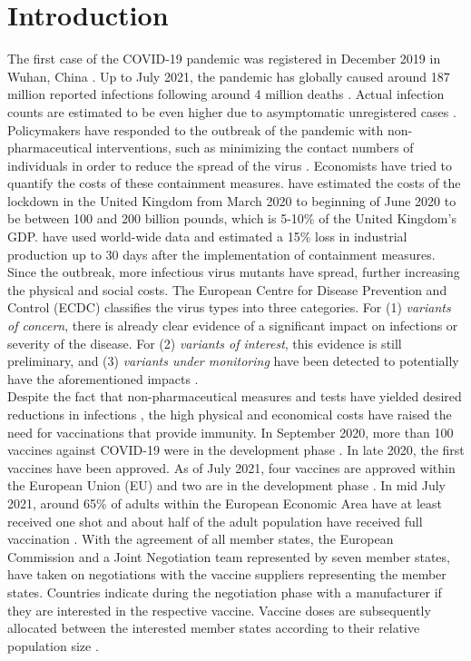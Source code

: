 \section{Introduction}
The first case of the COVID-19 pandemic was registered in December 2019 in Wuhan, China \citep{Hui.2020}. Up to July 2021, the pandemic has globally caused around 187 million reported infections following around 4 million deaths \citep{ecdc.2021a}. Actual infection counts are estimated to be even higher due to asymptomatic unregistered cases \citep{Byambasuren.2020}. Policymakers have responded to the outbreak of the pandemic with non-pharmaceutical interventions, such as minimizing the contact numbers of individuals in order to reduce the spread of the virus \citep{Gabler.2021}.  Economists have tried to quantify the costs of these containment measures. \cite{Miles.2020} have estimated the costs of the lockdown in the United Kingdom from March 2020 to beginning of June 2020 to be between 100 and 200 billion pounds, which is 5-10\% of the United Kingdom's GDP. \cite{Deb.2020} have used world-wide data and estimated a 15\% loss in industrial production up to 30 days after the implementation of containment measures. \\

Since the outbreak, more infectious virus mutants have spread, further increasing the physical and social costs. The European Centre for Disease Prevention and Control (ECDC) classifies the virus types into three categories. For (1) \textit{variants of concern}, there is already clear evidence of a significant impact on infections or severity of the disease. For (2) \textit{variants of interest}, this evidence is still preliminary, and (3) \textit{variants under monitoring} have been detected to potentially have the aforementioned impacts \citep{ecdc.2021b}. \\ 


Despite the fact that non-pharmaceutical measures and tests have yielded desired reductions in infections \citep{Gabler.2021}, the high physical and economical costs have raised the need for vaccinations that provide immunity.
In September 2020, more than 100 vaccines against COVID-19 were in the development phase \citep{Mullard.2020}. In late 2020, the first vaccines have been approved. As of July 2021, four vaccines are approved within the European Union (EU) and two are in the development phase \citep{ECa.2021}. In mid July 2021, around 65\% of adults within the European Economic Area have at least received one shot and about half of the adult population have received full vaccination \citep{ecdc.2021a}. With the agreement of all member states, the European Commission and a Joint Negotiation team represented by seven member states, have taken on negotiations with the vaccine suppliers representing the member states. Countries indicate during the negotiation phase with a manufacturer if they are interested in the respective vaccine. Vaccine doses are subsequently allocated between the interested member states according to their relative population size \citep{ec.2021}. \\

